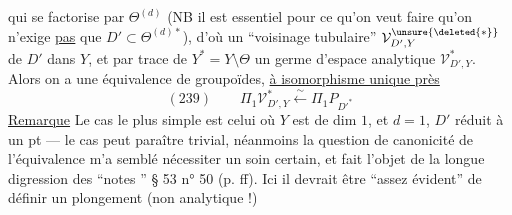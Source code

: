  qui se factorise par $\Theta^{(d)}$ (NB il est essentiel pour ce qu'on veut faire qu'on n'exige \uline{pas} que $D'\subset\Theta^{(d)*}$),  d'où un ``voisinage tubulaire'' $\mathcal V_{D',Y}^{\unsure{\deleted{*}}}$ de $D'$ dans $Y$, et par trace de $Y^{*}=Y\setminus\Theta$ un  germe d'espace analytique $\mathcal V^{*}_{D',Y}$. Alors on a une équivalence de groupoïdes, \uline{ à  isomorphisme unique près}
\[
(239)\qquad\Pi_1\mathcal V^{*}_{D',Y}\xleftarrow{\sim}\Pi_1P_{D'^{*}}
\]
\uline{Remarque} Le cas le plus simple est celui où $Y$ est de dim $1$, et $d=1$, $D'$ réduit à un pt --- le  cas peut paraître trivial, néanmoins la question de canonicité de l'équivalence m'a semblé nécessiter un soin certain, et fait l'objet de la longue digression des ``notes '' § 53 n° 50 (p.  ff). Ici  il devrait être ``assez évident'' de définir  un plongement   (non analytique !)
